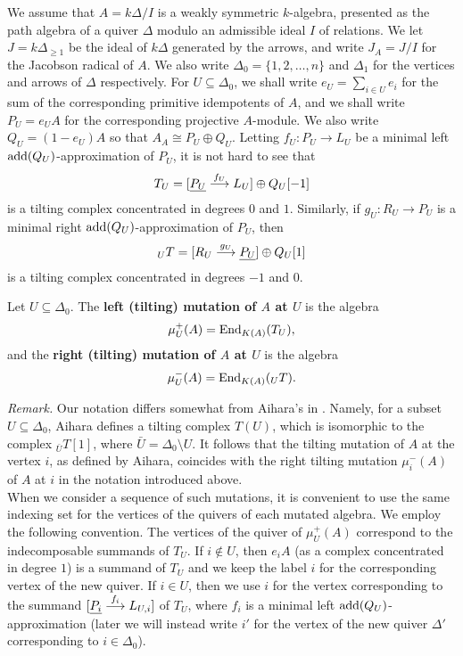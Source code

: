\documentclass{amsart}
\begin{document}
We assume that $A = k\Delta/I$ is a weakly symmetric $k$-algebra, presented as the path algebra of a quiver $\Delta$ modulo an admissible ideal $I$ of relations.  We let $J = k\Delta_{\geq 1}$ be the ideal of $k\Delta$ generated by the arrows, and write $J_A = J/I$ for the Jacobson radical of $A$.  We also write $\Delta_0 = \{1,2, \ldots, n\}$ and $\Delta_1$ for the vertices and arrows of $\Delta$ respectively.  For $U \subseteq \Delta_0$, we shall write $e_U = \sum_{i \in U} e_i$ for the sum of the corresponding primitive idempotents of $A$, and we shall write $P_U = e_U A$ for the corresponding projective $A$-module.  We also write $Q_U = (1-e_U)A$ so that $A_A \cong P_U \oplus Q_U$.  Letting $f_U : P_U \rightarrow L_U$ be a minimal left $\mathrm{add}(Q_U)$-approximation of $P_U$, it is not hard to see that $$T_U = [\underline{P_U} \stackrel{f_U}{\longrightarrow} L_U] \oplus Q_U[-1]$$ is a tilting complex concentrated in degrees $0$ and $1$.  Similarly, if $g_U : R_U \rightarrow P_U$ is a minimal right $\mathrm{add}(Q_U)$-approximation of $P_U$, then $${}_U T =  [R_U \stackrel{g_U}{\longrightarrow} \underline{P_U}] \oplus Q_U[1]$$ is a tilting complex concentrated in degrees $-1$ and $0$.

\begin{defin} Let $U \subseteq \Delta_0$.  The {\bf left (tilting) mutation of $A$ at $U$} is the algebra $$\mu^+_U(A) = \mathrm{End}_{K(A)}(T_U),$$ and the {\bf right (tilting) mutation of $A$ at $U$} is the algebra $$\mu^-_U(A) = \mathrm{End}_{K(A)}({}_U T).$$
\end{defin}

\noindent
{\it Remark.}  Our notation differs somewhat from Aihara's in \cite{Aih1}.  Namely, for a subset $U \subseteq \Delta_0$, Aihara defines a tilting complex $T(U)$, which is isomorphic to the complex ${}_{\bar{U}}T[1]$, where $\bar{U} = \Delta_0 \setminus U$.  It follows that the tilting mutation of $A$ at the vertex $i$, as defined by Aihara, coincides with the right tilting mutation $\mu^-_i(A)$ of $A$ at $i$ in the notation introduced above. \\

When we consider a sequence of such mutations, it is convenient to use the same indexing set for the vertices of the quivers of each mutated algebra. 
We employ the following convention.  The vertices of the quiver of $\mu^+_U(A)$ correspond to the indecomposable summands of $T_U$.  If $i \notin U$, then $e_i A$ (as a complex concentrated in degree $1$) is a summand of $T_U$ and we keep the label $i$ for the corresponding vertex of the new quiver.  If $i \in U$, then we use $i$ for the vertex corresponding to the summand $[\underline{P_i} \stackrel{f_i}{\longrightarrow} L_{U, i}]$ of $T_U$, where $f_i$ is a minimal left $\mathrm{add}(Q_U)$-approximation  (later we will instead write $i'$ for the vertex of the new quiver $\Delta'$ corresponding to $i \in \Delta_0$).
\end{document}
